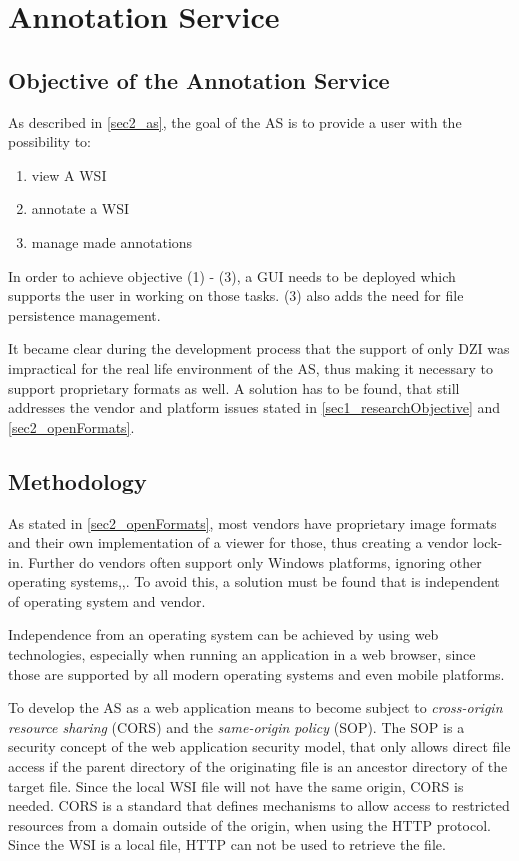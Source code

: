 \chapter{Annotation Service}

\section{Objective of the Annotation Service}
\label{sec4_objective}
As described in \ref{sec2_as}, the goal of the AS is to provide a user with the possibility to:
\begin{enumerate}[(1)]
	\item view A WSI
	\item annotate a WSI
	\item manage made annotations
\end{enumerate}

In order to achieve objective (1) - (3), a GUI needs to be deployed which supports the user in working on those tasks. (3) also adds the need for file persistence management.

It became clear during the development process that the support of only DZI was impractical for the real life environment of the AS, thus making it necessary to support proprietary formats as well. A solution has to be found, that still addresses the vendor and platform issues stated in \ref{sec1_researchObjective} and \ref{sec2_openFormats}.


\section{Methodology}
\label{sec4_methodology}
As stated in \ref{sec2_openFormats}, most vendors have proprietary image formats and their own implementation of a viewer for those, thus creating a vendor lock-in. Further do vendors often support only Windows platforms, ignoring other operating systems\cite{Cornish13},\cite{DICOM10},\cite{Farahanil15}. To avoid this, a solution must be found that is independent of operating system and vendor.

Independence from an operating system can be achieved by using web technologies, especially when running an application in a web browser, since those are supported by all modern operating systems and even mobile platforms\cite{Tseytlin14}.

To develop the AS as a web application means to become subject to \emph{cross-origin resource sharing} (CORS)\cite{Kesteren14} and the \emph{same-origin policy} (SOP)\cite{web:mdn}. The SOP is a security concept of the web application security model, that only allows direct file access if the parent directory of the originating file is an ancestor directory of the target file\cite{web:mdn}. Since the local WSI file will not have the same origin, CORS is needed. CORS is a standard that defines mechanisms to allow access to restricted resources from a domain outside of the origin, when using the HTTP protocol\cite{Kesteren14}. Since the WSI is a local file, HTTP can not be used to retrieve the file.

